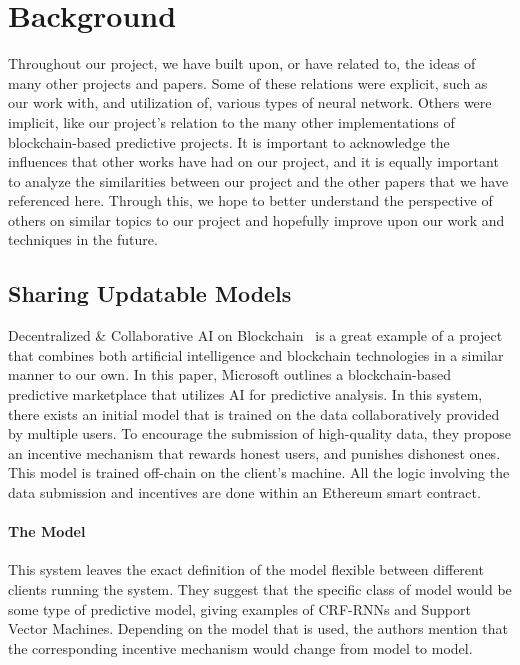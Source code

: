 \documentclass{ledger}
\begin{document}
\section{Background}

Throughout our project, we have built upon, or have related to, the ideas of many other projects and papers.
Some of these relations were explicit, such as our work with, and utilization of, various types of neural
network.  Others were implicit, like our project's relation to the many other implementations of
blockchain-based predictive projects.  It is important to acknowledge the influences that other works have
had on our project, and it is equally important to analyze the similarities between our project and the
other papers that we have referenced here.  Through this, we hope to better understand the perspective of
others on similar topics to our project and hopefully improve upon our work and techniques in the future.

\subsection{Sharing Updatable Models}

Decentralized \& Collaborative AI on Blockchain~\cite{sharingModels} is a great example of a project that combines
both artificial intelligence and blockchain technologies in a similar manner to our own.  In this paper, Microsoft
outlines a blockchain-based predictive marketplace that utilizes AI for predictive analysis.  In this system, there
exists an initial model that is trained on the data collaboratively provided by multiple users.  To encourage
the submission of high-quality data, they propose an incentive mechanism that rewards honest users, and punishes
dishonest ones.  This model is trained off-chain on the client's machine.  All the logic involving the
data submission and incentives are done within an Ethereum smart contract.

\paragraph{The Model}
This system leaves the exact definition of the model flexible between different clients running the system.  They
suggest that the specific class of model would be some type of predictive model, giving examples of CRF-RNNs and
Support Vector Machines.  Depending on the model that is used, the authors mention that the
corresponding incentive mechanism would change from model to model.
\end{document}
